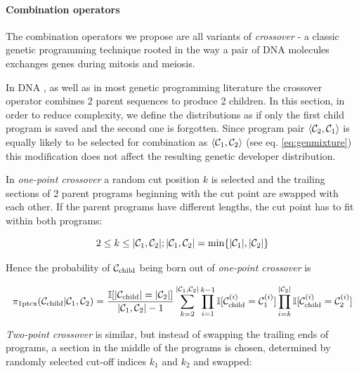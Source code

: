 \paragraph{Combination operators}

The combination operators we propose are all variants of \emph{crossover} - a classic genetic programming technique rooted in the way a pair of DNA molecules exchanges genes during mitosis and meiosis.

In DNA \cite{morganCritiqueTheoryEvolution1916}, as well as in most genetic programming literature \cite{banzhafGeneticProgrammingIntroduction1998,poliFieldGuideGenetic2008} the crossover operator combines 2 parent sequences to produce 2 children.
In this section, in order to reduce complexity, we define the distributions as if only the first child program is saved and the second one is forgotten.
Since program pair $\langle \mathcal{C}_2, \mathcal{C}_1 \rangle$ is equally likely to be selected for combination as $\langle \mathcal{C}_1, \mathcal{C}_2 \rangle$ (see eq. \ref{eq:genmixture}) this modification does not affect the resulting genetic developer distribution.

In \emph{one-point crossover} a random cut position $k$ is selected and the trailing sections of 2 parent programs beginning with the cut point are swapped with each other. 
If the parent programs have different lengths, the cut point has to fit within both programs:

\begin{equation}
    2 \leq k \leq |\mathcal{C}_1,\mathcal{C}_2|; |\mathcal{C}_1,\mathcal{C}_2| = \min\{|\mathcal{C}_1|, |\mathcal{C}_2|\}
\end{equation}

Hence the probability of $\mathcal{C}_\text{child}$ being born out of \emph{one-point crossover} is

\begin{equation}
    \pi_\text{1ptcx}(\mathcal{C}_\text{child}|\mathcal{C}_1,\mathcal{C}_2) =
        \frac{\mathbb{I} [|\mathcal{C}_\text{child}|=|\mathcal{C}_2|]}{|\mathcal{C}_1,\mathcal{C}_2|-1}
        \sum\limits_{k=2}^{|\mathcal{C}_1,\mathcal{C}_2|} \prod\limits_{i=1}^{k-1} \mathbb{I} [\mathcal{C}_\text{child}^{(i)} = \mathcal{C}_1^{(i)}] \prod\limits_{i=k}^{|\mathcal{C}_2|} \mathbb{I} [\mathcal{C}_\text{child}^{(i)} = \mathcal{C}_2^{(i)}]
\end{equation}

\emph{Two-point crossover} is similar, but instead of swapping the trailing ends of programs, a section in the middle of the programs is chosen, determined by randomly selected cut-off indices $k_1$ and $k_2$ and swapped:

